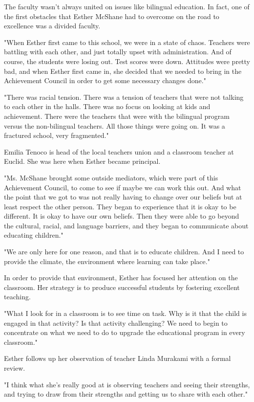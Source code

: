 The faculty wasn't always united on issues like bilingual education. In fact, one of the first obstacles that Esther McShane had to overcome on the road to excellence was a divided faculty.

"When Esther first came to this school, we were in a state of chaos. Teachers were battling with each other, and just totally upset with administration. And of course, the students were losing out. Test scores were down. Attitudes were pretty bad, and when Esther first came in, she decided that we needed to bring in the Achievement Council in order to get some necessary changes done."

"There was racial tension. There was a tension of teachers that were not talking to each other in the halls. There was no focus on looking at kids and achievement. There were the teachers that were with the bilingual program versus the non-bilingual teachers. All those things were going on. It was a fractured school, very fragmented."

Emilia Tenoco is head of the local teachers union and a classroom teacher at Euclid. She was here when Esther became principal.

"Ms. McShane brought some outside mediators, which were part of this Achievement Council, to come to see if maybe we can work this out. And what the point that we got to was not really having to change over our beliefs but at least respect the other person. They began to experience that it is okay to be different. It is okay to have our own beliefs. Then they were able to go beyond the cultural, racial, and language barriers, and they began to communicate about educating children."

"We are only here for one reason, and that is to educate children. And I need to provide the climate, the environment where learning can take place."

In order to provide that environment, Esther has focused her attention on the classroom. Her strategy is to produce successful students by fostering excellent teaching.

"What I look for in a classroom is to see time on task. Why is it that the child is engaged in that activity? Is that activity challenging? We need to begin to concentrate on what we need to do to upgrade the educational program in every classroom."

Esther follows up her observation of teacher Linda Murakami with a formal review.

"I think what she's really good at is observing teachers and seeing their strengths, and trying to draw from their strengths and getting us to share with each other."

